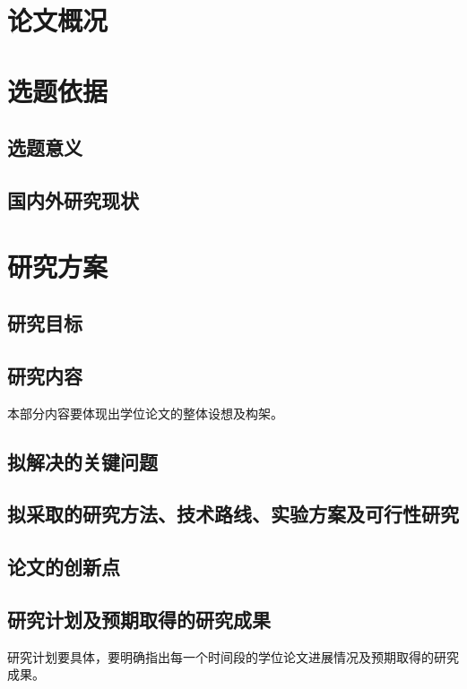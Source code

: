 \documentclass{xdupgtp}
\begin{document}
\section{论文概况}
\begin{xtly}
\end{xtly}
\begin{zwzy}
\end{zwzy}

\section{选题依据}
\begin{xtyj}
\subsection{选题意义}
\subsection{国内外研究现状}
\end{xtyj}

\section{研究方案}
\begin{yjfa}
\subsection{研究目标}
\subsection{研究内容}
本部分内容要体现出学位论文的整体设想及构架。
\subsection{拟解决的关键问题}
\subsection{拟采取的研究方法、技术路线、实验方案及可行性研究}
\subsection{论文的创新点} %
\subsection{研究计划及预期取得的研究成果}
研究计划要具体，要明确指出每一个时间段的学位论文进展情况及预期取得的研究成果。
\end{yjfa}
\end{document}
